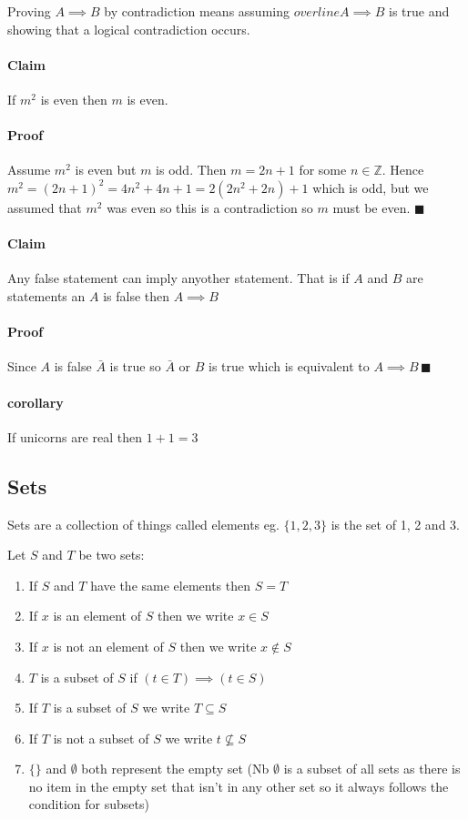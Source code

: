 \documentclass{article}
\begin{document}
Proving \(A\implies B\) by contradiction means assuming \(overline{A\implies B}\) is true and showing that a logical contradiction occurs.

\paragraph{Claim} If \(m^2\) is even then \(m\) is even.

\paragraph{Proof} Assume \(m^2\) is even but \(m\) is odd. Then \(m=2n+1\) for some \(n\in\mathbb{Z}\). Hence \(m^2=(2n+1)^2=4n^2+4n+1=2(2n^2+2n)+1\) which is odd, but we assumed that \(m^2\) was even so this is a contradiction so \(m\) must be even. \(\blacksquare\)

\paragraph{Claim} Any false statement can imply anyother statement. That is if \(A\) and \(B\) are statements an \(A\) is false then \(A\implies B\)

\paragraph{Proof} Since \(A\) is false \(\bar A\) is true so \(\bar A \text{ or } B\) is true which is equivalent to \(A\implies B\,\blacksquare\)

\paragraph{corollary} If unicorns are real then \(1+1=3\)

\subsection*{Sets}

Sets are a collection of things called elements eg. \(\{1,2,3\}\) is the set of 1, 2 and 3.

Let \(S\) and \(T\) be two sets:

\begin{enumerate}
\item If \(S\) and \(T\) have the same elements then \(S=T\)
\item If \(x\) is an element of \(S\) then we write \(x\in S\)
\item If \(x\) is not an element of \(S\) then we write \(x\notin S\)
\item \(T\) is a subset of \(S\) if \((t\in T)\implies(t\in S)\)
\item If \(T\) is a subset of \(S\) we write \(T\subseteq S\)
\item If \(T\) is not a subset of \(S\) we write \(t\nsubseteq S\)
\item \(\{\}\) and \(\emptyset\) both represent the empty set (Nb \(\emptyset\) is a subset of all sets as there is no item in the empty set that isn't in any other set so it always follows the condition for subsets)
\end{enumerate}
\end{document}
